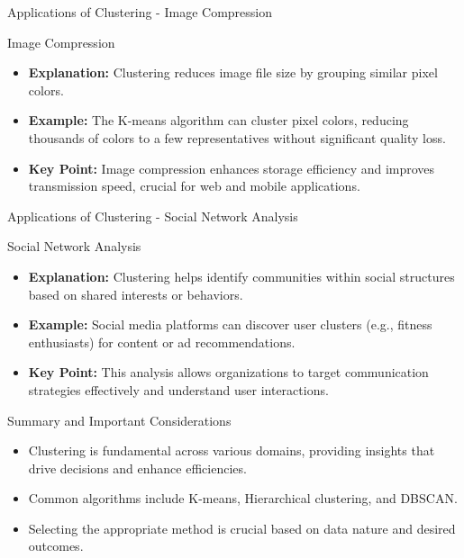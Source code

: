 \documentclass[aspectratio=169]{beamer}
\begin{document}
\begin{frame}[fragile]{Applications of Clustering - Image Compression}
    \begin{block}{Image Compression}
        \begin{itemize}
            \item \textbf{Explanation:} Clustering reduces image file size by grouping similar pixel colors.
            \item \textbf{Example:} The K-means algorithm can cluster pixel colors, reducing thousands of colors to a few representatives without significant quality loss.
            \item \textbf{Key Point:} Image compression enhances storage efficiency and improves transmission speed, crucial for web and mobile applications.
        \end{itemize}
    \end{block}
\end{frame}

\begin{frame}[fragile]{Applications of Clustering - Social Network Analysis}
    \begin{block}{Social Network Analysis}
        \begin{itemize}
            \item \textbf{Explanation:} Clustering helps identify communities within social structures based on shared interests or behaviors.
            \item \textbf{Example:} Social media platforms can discover user clusters (e.g., fitness enthusiasts) for content or ad recommendations.
            \item \textbf{Key Point:} This analysis allows organizations to target communication strategies effectively and understand user interactions.
        \end{itemize}
    \end{block}
\end{frame}

\begin{frame}[fragile]{Summary and Important Considerations}
    \begin{itemize}
        \item Clustering is fundamental across various domains, providing insights that drive decisions and enhance efficiencies.
        \item Common algorithms include K-means, Hierarchical clustering, and DBSCAN.
        \item Selecting the appropriate method is crucial based on data nature and desired outcomes.
    \end{itemize}
\end{frame}
\end{document}
